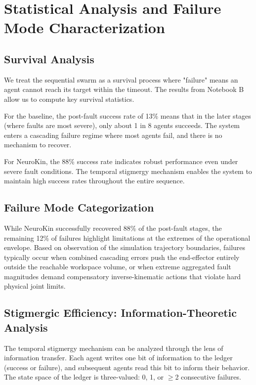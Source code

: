 \documentclass[12pt,a4paper,oneside]{report}
\begin{document}
\section{Statistical Analysis and Failure Mode Characterization}

\subsection{Survival Analysis}

We treat the sequential swarm as a survival process where "failure" means an agent cannot reach its target within the timeout. The results from Notebook B allow us to compute key survival statistics.

For the baseline, the post-fault success rate of 13\% means that in the later stages (where faults are most severe), only about 1 in 8 agents succeeds. The system enters a cascading failure regime where most agents fail, and there is no mechanism to recover.

For NeuroKin, the 88\% success rate indicates robust performance even under severe fault conditions. The temporal stigmergy mechanism enables the system to maintain high success rates throughout the entire sequence.

\subsection{Failure Mode Categorization}

While NeuroKin successfully recovered 88\% of the post-fault stages, the remaining 12\% of failures highlight limitations at the extremes of the operational envelope. Based on observation of the simulation trajectory boundaries, failures typically occur when combined cascading errors push the end-effector entirely outside the reachable workspace volume, or when extreme aggregated fault magnitudes demand compensatory inverse-kinematic actions that violate hard physical joint limits.

\subsection{Stigmergic Efficiency: Information-Theoretic Analysis}

The temporal stigmergy mechanism can be analyzed through the lens of information transfer. Each agent writes one bit of information to the ledger (success or failure), and subsequent agents read this bit to inform their behavior. The state space of the ledger is three-valued: 0, 1, or $\geq$2 consecutive failures.
\end{document}
